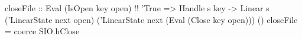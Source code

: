 \begin{code}
closeFile
    :: Eval (IsOpen key open) !\tyeq! 'True
    => Handle s key
    -> Linear s ('LinearState next open)
                ('LinearState next (Eval (Close key open)))
                ()
closeFile = coerce SIO.hClose
\end{code}
